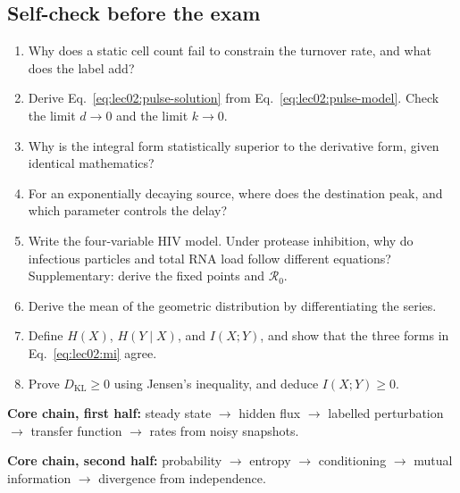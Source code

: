 \subsection*{Self-check before the exam}
\begin{enumerate}
\item Why does a static cell count fail to constrain the turnover rate, and what does the label add?
\item Derive Eq.~\eqref{eq:lec02:pulse-solution} from Eq.~\eqref{eq:lec02:pulse-model}. Check the limit $d\to0$ and the limit $k\to0$.
\item Why is the integral form statistically superior to the derivative form, given identical mathematics?
\item For an exponentially decaying source, where does the destination peak, and which parameter controls the delay?
\item Write the four-variable HIV model. Under protease inhibition, why do infectious particles and total RNA load follow different equations? Supplementary: derive the fixed points and $\mathcal R_0$.
\item Derive the mean of the geometric distribution by differentiating the series.
\item Define $H(X)$, $H(Y\mid X)$, and $I(X;Y)$, and show that the three forms in Eq.~\eqref{eq:lec02:mi} agree.
\item Prove $D_{\mathrm{KL}}\geq0$ using Jensen's inequality, and deduce $I(X;Y)\geq0$.
\end{enumerate}

\textbf{Core chain, first half:} steady state $\to$ hidden flux $\to$ labelled perturbation $\to$ transfer function $\to$ rates from noisy snapshots.

\textbf{Core chain, second half:} probability $\to$ entropy $\to$ conditioning $\to$ mutual information $\to$ divergence from independence.

